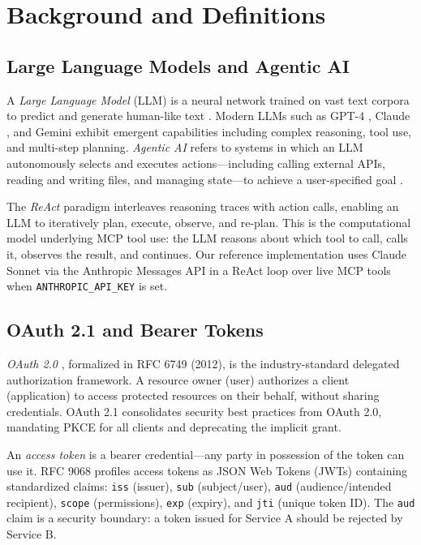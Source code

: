 \documentclass[journal]{IEEEtran}
\begin{document}
\section{Background and Definitions}
\label{sec:background}

\subsection{Large Language Models and Agentic AI}

A \textit{Large Language Model} (LLM) is a neural network trained on vast text corpora to predict and generate human-like text \cite{vaswani2017}. Modern LLMs such as GPT-4 \cite{openai2023gpt4}, Claude \cite{anthropic_claude}, and Gemini exhibit emergent capabilities including complex reasoning, tool use, and multi-step planning. \textit{Agentic AI} refers to systems in which an LLM autonomously selects and executes actions—including calling external APIs, reading and writing files, and managing state—to achieve a user-specified goal \cite{wang2024survey}.

The \textit{ReAct} paradigm \cite{yao2022react} interleaves reasoning traces with action calls, enabling an LLM to iteratively plan, execute, observe, and re-plan. This is the computational model underlying MCP tool use: the LLM reasons about which tool to call, calls it, observes the result, and continues. Our reference implementation uses Claude Sonnet via the Anthropic Messages API in a ReAct loop over live MCP tools when \texttt{ANTHROPIC\_API\_KEY} is set.

\subsection{OAuth 2.1 and Bearer Tokens}

\textit{OAuth 2.0} \cite{rfc6749}, formalized in RFC 6749 (2012), is the industry-standard delegated authorization framework. A resource owner (user) authorizes a client (application) to access protected resources on their behalf, without sharing credentials. OAuth 2.1 \cite{oauth21} consolidates security best practices from OAuth 2.0, mandating PKCE for all clients and deprecating the implicit grant.

An \textit{access token} is a bearer credential—any party in possession of the token can use it. RFC 9068 \cite{rfc9068} profiles access tokens as JSON Web Tokens (JWTs) \cite{rfc7519} containing standardized claims: \texttt{iss} (issuer), \texttt{sub} (subject/user), \texttt{aud} (audience/intended recipient), \texttt{scope} (permissions), \texttt{exp} (expiry), and \texttt{jti} (unique token ID). The \texttt{aud} claim is a security boundary: a token issued for Service A should be rejected by Service B.
\end{document}
